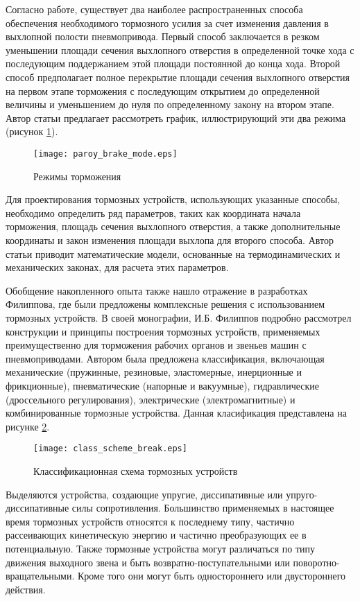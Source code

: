 Согласно работе, существует два наиболее распространенных способа обеспечения необходимого
тормозного усилия за счет изменения давления в выхлопной полости пневмопривода. Первый способ заключается в
резком уменьшении площади сечения выхлопного отверстия в определенной точке хода с
последующим поддержанием этой площади постоянной до конца хода. Второй способ предполагает
полное перекрытие площади сечения выхлопного отверстия на первом этапе торможения с последующим
открытием до определенной величины и уменьшением до нуля по определенному закону на втором этапе.
Автор статьи предлагает рассмотреть график, иллюстрирующий эти два режима (рисунок \cref*{fig:парой_режимы_торможения}).

\begin{figure}[h]
	\centerfloat
	\texttt{[image: paroy\_brake\_mode.eps]}
	\caption{Режимы торможения}\label{fig:парой_режимы_торможения}
\end{figure}

Для проектирования тормозных устройств, использующих указанные способы, необходимо определить ряд
параметров, таких как координата начала торможения, площадь сечения выхлопного отверстия,
а также дополнительные координаты и закон изменения площади выхлопа для второго способа.
Автор статьи приводит математические модели, основанные на термодинамических и механических законах,
для расчета этих параметров.

Обобщение накопленного опыта также нашло отражение в разработках Филиппова, где были предложены комплексные решения с использованием
тормозных устройств. В своей монографии, И.Б. Филиппов \cite*{филипов:тормозные_устройства} подробно рассмотрел конструкции и
принципы построения тормозных устройств, применяемых преимущественно для торможения рабочих органов и звеньев машин
с пневмоприводами. Автором была предложена классификация, включающая механические (пружинные, резиновые, эластомерные, инерционные и фрикционные),
пневматические (напорные и вакуумные), гидравлические (дроссельного регулирования), электрические (электромагнитные) и комбинированные тормозные устройства.
Данная класификация представлена на рисунке \cref*{fig:класс_схема_тормозных_устройств}.


\begin{figure}[h]
	\centerfloat
	\texttt{[image: class\_scheme\_break.eps]}
	\caption{Классификационная схема тормозных устройств}
	\label{fig:класс_схема_тормозных_устройств}
\end{figure}

Выделяются устройства, создающие упругие,
диссипативные или упруго-диссипативные силы сопротивления. Большинство применяемых в настоящее
время тормозных устройств относятся к последнему типу, частично рассеивающих кинетическую энергию и
частично преобразующих ее в потенциальную. Также тормозные устройства могут различаться
по типу движения выходного звена и быть возвратно-поступательными или поворотно-вращательными. Кроме
того они могут быть одностороннего или двустороннего действия.


